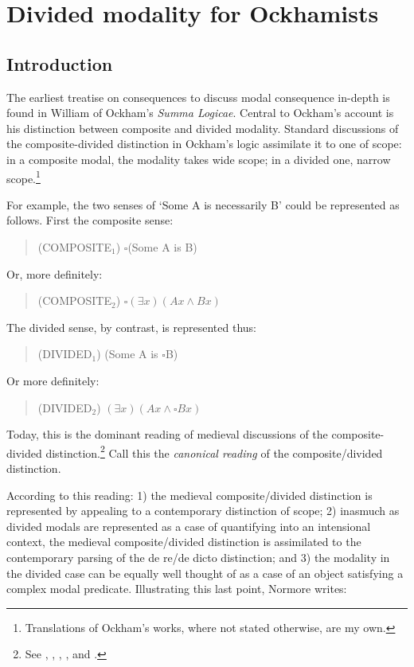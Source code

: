 \chapter{Divided modality for Ockhamists}
\section{Introduction}
	The earliest treatise on consequences to discuss modal consequence in-depth is found in William of Ockham's \textit{Summa Logicae}. Central to Ockham's account is his distinction between composite and divided modality. Standard discussions of the composite-divided distinction in Ockham's logic assimilate it to one of scope: in a composite modal, the modality takes wide scope; in a divided one, narrow scope.\footnote{Translations of Ockham's works, where not stated otherwise, are my own.}
	
	For example, the two senses of `Some A is necessarily B' could be represented as follows. First the composite sense: 
	
	\begin{quote}
		(COMPOSITE$_{1}$) $\square$(Some A is B)
	\end{quote}
	
	\noindent Or, more definitely:
	
	\begin{quote}
		(COMPOSITE$_{2}$) $\square(\exists x)(Ax \wedge Bx)$
	\end{quote}
	
	The divided sense, by contrast, is represented thus:
	
	\begin{quote}
		(DIVIDED$_{1}$) (Some A is $\square$B)
	\end{quote}
	
	\noindent Or more definitely:
	
	\begin{quote}
		(DIVIDED$_{2}$) $(\exists x)(Ax \wedge \square Bx)$
	\end{quote}
	
	Today, this is the dominant reading of medieval discussions of the composite-divided distinction.\footnote{See \cite{PriestRead1981}, \cite{Read2007}, \cite[p. 350]{DutilhNovaes2007}, \cite[p. 298]{Parsons2014}, and \cite[pp. 237-238]{Johnston2015}.} Call this the \textit{canonical reading} of the composite/divided distinction. 
	
	According to this reading: 1) the medieval composite/divided distinction is represented by appealing to a contemporary distinction of scope; 2) inasmuch as divided modals are represented as a case of quantifying into an intensional context, the medieval composite/divided distinction is assimilated to the contemporary parsing of the de re/de dicto distinction;  and 3) the modality in the divided case can be equally well thought of as a case of an object satisfying a complex modal predicate. Illustrating this last point, Normore writes: 
	
